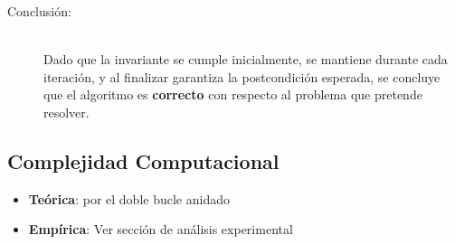 \documentclass[informe.tex]{subfiles}
\begin{document}
\begin{description}
	\item[Conclusión:] ~\\
	      Dado que la invariante se cumple inicialmente, se mantiene durante cada iteración, y al
	      finalizar garantiza la postcondición esperada, se concluye que el algoritmo es
	      \textbf{correcto} con respecto al problema que pretende resolver.
\end{description}


\subsection{Complejidad Computacional}

\begin{itemize}
	\item \textbf{Teórica}:  por el doble bucle anidado
	\item \textbf{Empírica}: Ver sección de análisis experimental
\end{itemize}
\end{document}
